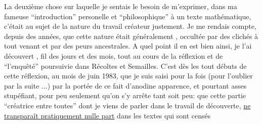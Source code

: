 La deuxième chose sur laquelle je sentais le besoin de m'exprimer, dans ma fameuse ``introduction''  personelle et ``philosophique'' à un texte mathématique, c'était au sujet de la nature du travail créateur justement. Je me rendais compte, depuis des années, que cette nature était généralement , occultée par des clichés à tout venant et par des peurs ancestrales. A quel point il en est bien ainsi, je l'ai découvert ,  fil des jours et des mois, tout au cours de la réflexion et de ``l'enquêté'' poursuivie dans Récoltes et Semailles. C'est dès les tout débuts de cette réflexion, au mois de juin 1983, que je suis saisi pour la  fois (pour l'oublier  par la suite ...) par la portée de ce fait d'anodine apparence, et pourtant asses stupéfiant, pour peu seulement qu'on s'y arrête tant soit peu: que cette partie ``créatrice entre toutes'' dont je viens de parler dans le travail de découverte, \uline{ne transparaît pratiquement nulle part} dans les textes qui sont censés
